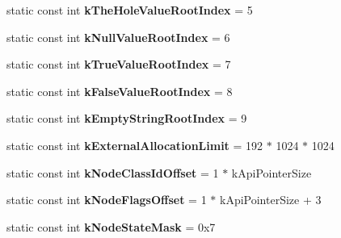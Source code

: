 \begin{DoxyCompactItemize}
\item 
static const int {\bfseries k\+The\+Hole\+Value\+Root\+Index} = 5\hypertarget{classv8_1_1internal_1_1_internals_ac07a35d3efef0c107062b3eb88696e31}{}\label{classv8_1_1internal_1_1_internals_ac07a35d3efef0c107062b3eb88696e31}

\item 
static const int {\bfseries k\+Null\+Value\+Root\+Index} = 6\hypertarget{classv8_1_1internal_1_1_internals_ab311cf753ec5c968052bd83ef21e83f8}{}\label{classv8_1_1internal_1_1_internals_ab311cf753ec5c968052bd83ef21e83f8}

\item 
static const int {\bfseries k\+True\+Value\+Root\+Index} = 7\hypertarget{classv8_1_1internal_1_1_internals_a93abd58b178eca469bade28e68b5c59e}{}\label{classv8_1_1internal_1_1_internals_a93abd58b178eca469bade28e68b5c59e}

\item 
static const int {\bfseries k\+False\+Value\+Root\+Index} = 8\hypertarget{classv8_1_1internal_1_1_internals_a90b6837aa368bbe4ffd914e6f753b167}{}\label{classv8_1_1internal_1_1_internals_a90b6837aa368bbe4ffd914e6f753b167}

\item 
static const int {\bfseries k\+Empty\+String\+Root\+Index} = 9\hypertarget{classv8_1_1internal_1_1_internals_a6f669f3d98fe653b281b26be3bc0655a}{}\label{classv8_1_1internal_1_1_internals_a6f669f3d98fe653b281b26be3bc0655a}

\item 
static const int {\bfseries k\+External\+Allocation\+Limit} = 192 $\ast$ 1024 $\ast$ 1024\hypertarget{classv8_1_1internal_1_1_internals_aa88e5a295f86584aa3e90ebc1a6c4739}{}\label{classv8_1_1internal_1_1_internals_aa88e5a295f86584aa3e90ebc1a6c4739}

\item 
static const int {\bfseries k\+Node\+Class\+Id\+Offset} = 1 $\ast$ k\+Api\+Pointer\+Size\hypertarget{classv8_1_1internal_1_1_internals_af4fb6d499cb87f03031ad4d6be6bcd8f}{}\label{classv8_1_1internal_1_1_internals_af4fb6d499cb87f03031ad4d6be6bcd8f}

\item 
static const int {\bfseries k\+Node\+Flags\+Offset} = 1 $\ast$ k\+Api\+Pointer\+Size + 3\hypertarget{classv8_1_1internal_1_1_internals_aee5606f2a44d43d8dafe344e0bb753ef}{}\label{classv8_1_1internal_1_1_internals_aee5606f2a44d43d8dafe344e0bb753ef}

\item 
static const int {\bfseries k\+Node\+State\+Mask} = 0x7\hypertarget{classv8_1_1internal_1_1_internals_a853acc088978d38a5a69091cf857a46d}{}\label{classv8_1_1internal_1_1_internals_a853acc088978d38a5a69091cf857a46d}


\end{DoxyCompactItemize}

